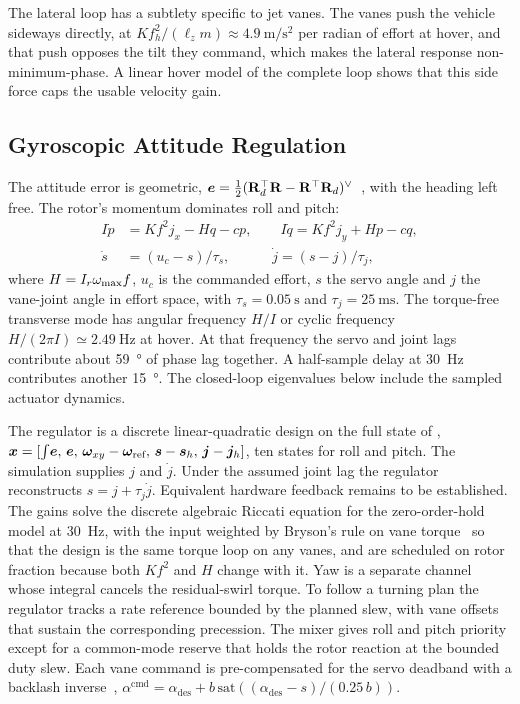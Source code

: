\documentclass[10pt,letterpaper]{article}
\begin{document}
The lateral loop has a subtlety specific to jet vanes.
The vanes push the vehicle sideways directly, at $Kf_h^2/(\ell_z m) \approx \SI{4.9}{\metre\per\second\squared}$ per radian of effort at hover, and that push opposes the tilt they command, which makes the lateral response non-minimum-phase.
A linear hover model of the complete loop shows that this side force caps the usable velocity gain.

\subsection{Gyroscopic Attitude Regulation}
\label{sec:lqr}

The attitude error is geometric, $\bm{e} = \tfrac12(\mathbf{R}_d^\top\mathbf{R} - \mathbf{R}^\top\mathbf{R}_d)^\vee$~\cite{lee2010geometric}, with the heading left free.
The rotor's momentum dominates roll and pitch:
\begin{equation}
\begin{split}
I\dot p &= Kf^2 j_x - Hq - cp, \qquad I\dot q = Kf^2 j_y + Hp - cq,\\
\dot s &= (u_c - s)/\tau_s, \qquad\quad \dot j = (s - j)/\tau_j ,
\end{split}
\label{eq:attplant}
\end{equation}
where $H = I_r\omega_{\max} f$, $u_c$ is the commanded effort, $s$ the servo angle and $j$ the vane-joint angle in effort space, with $\tau_s = \SI{0.05}{\second}$ and $\tau_j = \SI{25}{\milli\second}$.
The torque-free transverse mode has angular frequency $H/I$ or cyclic frequency $H/(2\pi I)\simeq\SI{2.49}{\hertz}$ at hover.
At that frequency the servo and joint lags contribute about \SI{59}{\degree} of phase lag together. A half-sample delay at \SI{30}{\hertz} contributes another \SI{15}{\degree}. The closed-loop eigenvalues below include the sampled actuator dynamics.

The regulator is a discrete linear-quadratic design on the full state of , $\bm{x} = [\int\!\bm{e},\, \bm{e},\, \bm{\omega}_{xy} - \bm{\omega}_{\text{ref}},\, \bm{s} - \bm{s}_h,\, \bm{j} - \bm{j}_h]$, ten states for roll and pitch.
The simulation supplies $j$ and $\dot j$. Under the assumed joint lag the regulator reconstructs $s=j+\tau_j\dot j$. Equivalent hardware feedback remains to be established.
The gains solve the discrete algebraic Riccati equation for the zero-order-hold model at \SI{30}{\hertz}, with the input weighted by Bryson's rule on vane torque~\cite{bryson1975} so that the design is the same torque loop on any vanes, and are scheduled on rotor fraction because both $Kf^2$ and $H$ change with it.
Yaw is a separate channel whose integral cancels the residual-swirl torque.
To follow a turning plan the regulator tracks a rate reference bounded by the planned slew, with vane offsets that sustain the corresponding precession.
The mixer gives roll and pitch priority except for a common-mode reserve that holds the rotor reaction at the bounded duty slew.
Each vane command is pre-compensated for the servo deadband with a backlash inverse~\cite{tao1996}, $\alpha^{\text{cmd}} = \alpha_{\text{des}} + b\,\mathrm{sat}((\alpha_{\text{des}} - s)/(0.25\,b))$.
\end{document}
